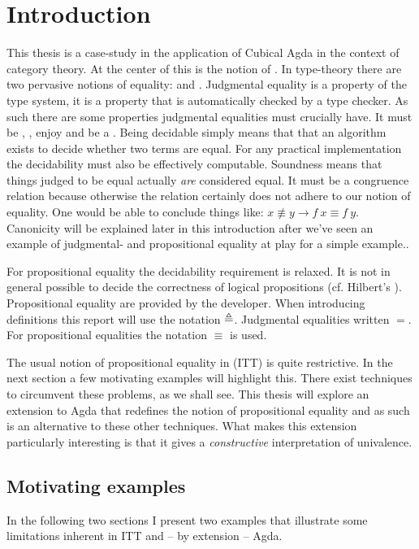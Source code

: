 \chapter{Introduction}
This thesis is a case-study in the application of Cubical Agda in the
context of category theory. At the center of this is the notion of
. In type-theory there are two pervasive notions
of equality:  and
. Judgmental equality is a property
of the type system, it is a property that is automatically checked by
a type checker. As such there are some properties judgmental
equalities must crucially have. It must be ,
, enjoy  and be a
. Being decidable simply means that that an
algorithm exists to decide whether two terms are equal. For any
practical implementation the decidability must also be effectively
computable. Soundness means that things judged to be equal actually
\emph{are} considered equal. It must be a congruence relation because
otherwise the relation certainly does not adhere to our notion of
equality. One would be able to conclude things like: $x \nequiv y
\rightarrow f\ x \equiv f\ y$. Canonicity will be explained later in
this introduction after we've seen an example of judgmental- and
propositional equality at play for a simple example..

For propositional equality the decidability requirement is relaxed. It
is not in general possible to decide the correctness of logical
propositions (cf. Hilbert's ).
Propositional equality are provided by the developer. When introducing
definitions this report will use the notation $\mathrel{\triangleq}$. Judgmental
equalities written $=$. For propositional equalities the notation
$\equiv$ is used.

The usual notion of propositional equality in  (ITT) is quite restrictive. In the next section a few
motivating examples will highlight this. There exist techniques to
circumvent these problems, as we shall see. This thesis will explore
an extension to Agda that redefines the notion of propositional
equality and as such is an alternative to these other techniques. What
makes this extension particularly interesting is that it gives a
\emph{constructive} interpretation of univalence.
%
\section{Motivating examples}
%
In the following two sections I present two examples that illustrate
some limitations inherent in ITT and -- by extension -- Agda.
%
